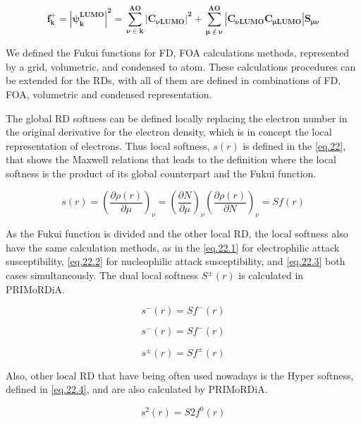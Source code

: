 \documentclass[a4paper,11pt]{refart}
\begin{document}
\begin{equation}
\mathbf{f^+_k = |\psi^{LUMO}_k|^2 = \sum_{\nu \in k}^{AO} |C_{\nu LUMO}|^{2} + \sum_{\mu \notin \nu }^{AO} |C_{\nu LUMO} C_{\mu LUMO}|S_{\mu \nu} }
\label{eq.21}
\end{equation}

We defined the Fukui functions for FD, FOA calculations methods, represented by a grid, volumetric, and condensed to atom. These calculations procedures can be extended for the RDs, with all of them are defined in combinations of FD, FOA, volumetric and condensed representation.   


The global RD softness can be defined locally replacing the electron number in the original derivative for the electron density, which is in concept the local representation of electrons. Thus local softness, $s(r)$ is defined in the \autoref{eq.22}, that shows the Maxwell relations that leads to the definition where the local softness is the product of its global counterpart and the Fukui function. 

\begin{equation}
s(r)= \left(\frac{\partial \rho(r)}{\partial \mu} \right)_\nu =
\left(\frac{\partial N}{\partial \mu}\right)_\nu
\left(\frac{\partial \rho(r)}{\partial N} \right)_\nu = Sf(r)
\label{eq.22}
\end{equation}

As the Fukui function is divided and the other local RD, the local softness also have the same calculation methods, as in the \autoref{eq.22.1} for electrophilic attack susceptibility,  \autoref{eq.22.2} for nucleophilic attack susceptibility, and \autoref{eq.22.3} both cases simultaneously. The dual local softness $S^{\pm}(r)$ is calculated in PRIMoRDiA.   

\begin{equation}
s^-(r) = Sf^-(r)
\label{eq.22.1}
\end{equation}

\begin{equation}
s^-(r) = Sf^-(r)
\label{eq.22.2}
\end{equation}

\begin{equation}
s^{\pm}(r) = Sf^{\pm}(r)
\label{eq.22.3}
\end{equation}

Also, other local RD that have being often used nowadays is the Hyper softness, defined in \autoref{eq.22.4}, and are also calculated by PRIMoRDiA. 

\begin{equation}
s^{2}(r) = S2f^{0}(r)
\label{eq.22.4}
\end{equation}
\end{document}
